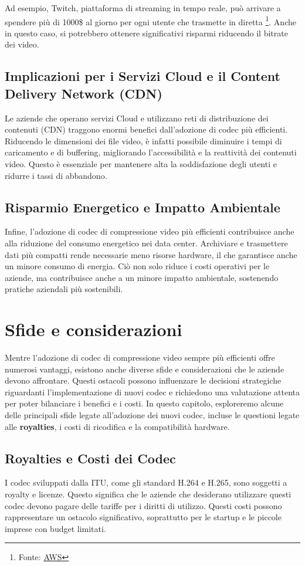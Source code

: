 \documentclass[a4paper,12pt, oneside]{article}
\begin{document}
Ad esempio, Twitch, piattaforma di streaming in tempo reale, può arrivare a spendere più di
1000\$ al giorno per ogni utente che trasmette in diretta \footnote{Fonte: \href{https://ivs.rocks/calculator}{AWS}}.
Anche in questo caso, si potrebbero ottenere significativi risparmi riducendo il bitrate dei video.

\subsection{Implicazioni per i Servizi Cloud e il Content Delivery Network (CDN)}
Le aziende che operano servizi Cloud e utilizzano reti di distribuzione dei contenuti (CDN) traggono
enormi benefici dall'adozione di codec più efficienti. Riducendo le dimensioni dei file video, è infatti
possibile diminuire i tempi di caricamento e di buffering, migliorando l'accessibilità e la reattività
dei contenuti video. Questo è essenziale per mantenere alta la soddisfazione degli utenti e ridurre i
tassi di abbandono.

\subsection{Risparmio Energetico e Impatto Ambientale}
Infine, l'adozione di codec di compressione video più efficienti contribuisce anche alla riduzione del
consumo energetico nei data center. Archiviare e trasmettere dati più compatti rende necessarie meno
risorse hardware, il che garantisce anche un minore consumo di energia. Ciò non solo riduce
i costi operativi per le aziende, ma contribuisce anche a un minore impatto ambientale, sostenendo
pratiche aziendali più sostenibili.

\section{Sfide e considerazioni}
Mentre l'adozione di codec di compressione video sempre più efficienti offre numerosi vantaggi,
esistono anche diverse sfide e considerazioni che le aziende devono affrontare. Questi ostacoli
possono influenzare le decisioni strategiche riguardanti l'implementazione di nuovi codec e
richiedono una valutazione attenta per poter bilanciare i benefici e i costi. In questo capitolo,
esploreremo alcune delle principali sfide legate all'adozione dei nuovi codec, incluse le
questioni legate alle \textbf{royalties}, i costi di ricodifica e la compatibilità hardware.

\subsection{Royalties e Costi dei Codec}
I codec sviluppati dalla ITU, come gli standard H.264 e H.265, sono soggetti a royalty e
licenze. Questo significa che le aziende che desiderano utilizzare questi codec devono pagare
delle tariffe per i diritti di utilizzo. Questi costi possono rappresentare un ostacolo
significativo, soprattutto per le startup e le piccole imprese con budget limitati.
\end{document}
